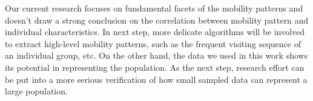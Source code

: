 \documentclass{vgtc}                          %
\begin{document}
Our current research focuses on fundamental facets of the mobility patterns and doesn't draw a strong conclusion on the correlation between mobility pattern and individual characteristics. In next step, more delicate algorithms will be involved to extract high-level mobility patterns, such as the frequent visiting sequence of an individual group, etc. On the other hand, the data we used in this work shows its potential in representing the population. As the next step, research effort can be put into a more serious verification of how small sampled data can represent a large population.








\end{document}
